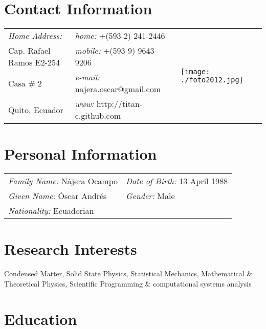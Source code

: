 \documentclass[margin,line]{res}
\newenvironment{list1}{
  \begin{list}{\ding{113}}{%
      \setlength{\itemsep}{0in}
      \setlength{\parsep}{0in} \setlength{\parskip}{0in}
      \setlength{\topsep}{0in} \setlength{\partopsep}{0in} 
      \setlength{\leftmargin}{0.17in}}}{\end{list}}
\begin{document}

\begin{resume}

\section{\sc Contact Information}
  \begin{tabular}{@{}p{2in}p{2.5in}p{3cm} }
    {\it Home Address:}		& {\it home:}  +(593-2) 241-2446 &
      \multirow{4}{*}{ \texttt{[image: ./foto2012.jpg]}}\\

    Cap. Rafael Ramos E2-254	& {\it mobile:} +(593-9) 9643-9206 \\
    Casa \# 2			& {\it e-mail:}  najera.oscar@gmail.com\\
    Quito, Ecuador		& {\it www:} http://titan-c.github.com
  \end{tabular}\vspace{0.5cm}

\section{\sc Personal Information}
 \begin{tabular}{ll}
  {\it Family Name:} Nájera Ocampo & {\it Date of Birth:} 13 April 1988\\
  {\it Given Name:} Óscar Andrés   & {\it Gender:} Male\\
  {\it Nationality:} Ecuadorian    & %
 \end{tabular}

\section{\sc Research Interests}
  Condensed Matter, Solid State Physics, Statistical Mechanics, Mathematical \& Theoretical Physics, Scientific Programming \& computational systems analysis

\section{\sc Education}


\end{resume}
\end{document}
